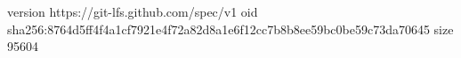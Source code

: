 version https://git-lfs.github.com/spec/v1
oid sha256:8764d5ff4f4a1cf7921e4f72a82d8a1e6f12cc7b8b8ee59bc0be59c73da70645
size 95604
